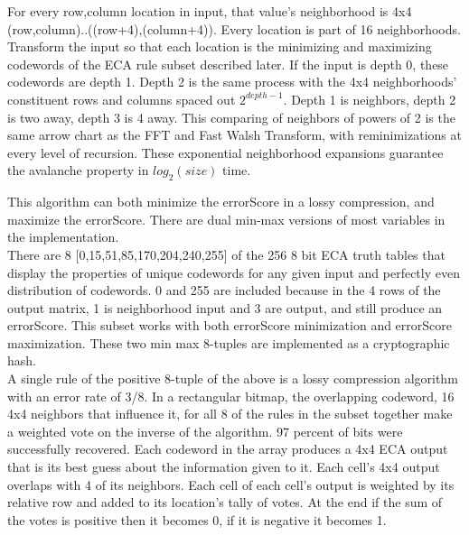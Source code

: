 \documentclass[11pt]{article}
\begin{document}
For every row,column location in input, that value's neighborhood is 4x4 (row,column)..((row+4),(column+4)). Every location is part of 16 neighborhoods. Transform the input so that each location is the minimizing and maximizing codewords of the ECA rule subset described later. If the input is depth 0, these codewords are depth 1. Depth 2 is the same process with the 4x4 neighborhoods' constituent rows and columns spaced out $2^{depth-1}$. Depth 1 is neighbors, depth 2 is two away, depth 3 is 4 away. This comparing of neighbors of powers of 2 is the same arrow chart as the FFT and Fast Walsh Transform, with reminimizations at every level of recursion. These exponential neighborhood expansions guarantee the avalanche property in $log_2(size)$ time.

This algorithm can both minimize the errorScore in a lossy compression, and maximize the errorScore. There are dual min-max versions of most variables in the implementation.\\

There are 8 [0,15,51,85,170,204,240,255] of the 256 8 bit ECA truth tables that display the properties of unique codewords for any given input and perfectly even distribution of codewords. 0 and 255 are included because in the 4 rows of the output matrix, 1 is neighborhood input and 3 are output, and still produce an errorScore. This subset works with both errorScore minimization and errorScore maximization. These two min max 8-tuples are implemented as a cryptographic hash.\\

A single rule of the positive 8-tuple of the above is a lossy compression algorithm with an error rate of 3/8. In a rectangular bitmap, the overlapping codeword, 16 4x4 neighbors that influence it, for all 8 of the rules in the subset together make a weighted vote on the inverse of the algorithm. 97 percent of bits were successfully recovered. Each codeword in the array produces a 4x4 ECA output that is its best guess about the information given to it. Each cell's 4x4 output overlaps with 4 of its neighbors. Each cell of each cell's output is weighted by its relative row and added to its location's tally of votes. At the end if the sum of the votes is positive then it becomes 0, if it is negative it becomes 1.
\end{document}
